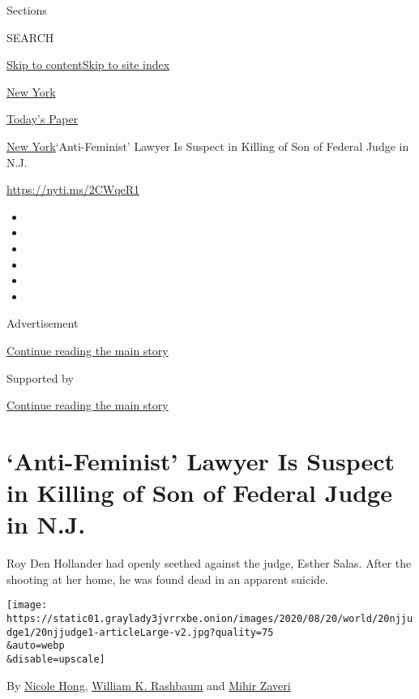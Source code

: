 Sections

SEARCH

\protect\hyperlink{site-content}{Skip to
content}\protect\hyperlink{site-index}{Skip to site index}

\href{https://www.nytimes3xbfgragh.onion/section/nyregion}{New York}

\href{https://myaccount.nytimes3xbfgragh.onion/auth/login?response_type=cookie\&client_id=vi}{}

\href{https://www.nytimes3xbfgragh.onion/section/todayspaper}{Today's
Paper}

\href{/section/nyregion}{New York}\textbar{}`Anti-Feminist' Lawyer Is
Suspect in Killing of Son of Federal Judge in N.J.

\url{https://nyti.ms/2CWqeR1}

\begin{itemize}
\item
\item
\item
\item
\item
\item
\end{itemize}

Advertisement

\protect\hyperlink{after-top}{Continue reading the main story}

Supported by

\protect\hyperlink{after-sponsor}{Continue reading the main story}

\hypertarget{anti-feminist-lawyer-is-suspect-in-killing-of-son-of-federal-judge-in-nj}{%
\section{`Anti-Feminist' Lawyer Is Suspect in Killing of Son of Federal
Judge in
N.J.}\label{anti-feminist-lawyer-is-suspect-in-killing-of-son-of-federal-judge-in-nj}}

Roy Den Hollander had openly seethed against the judge, Esther Salas.
After the shooting at her home, he was found dead in an apparent
suicide.

\texttt{[image: https://static01.graylady3jvrrxbe.onion/images/2020/08/20/world/20njjudge1/20njjudge1-articleLarge-v2.jpg?quality=75\\\&auto=webp\\\&disable=upscale]}

By \href{https://www.nytimes3xbfgragh.onion/by/nicole-hong}{Nicole
Hong},
\href{https://www.nytimes3xbfgragh.onion/by/william-k-rashbaum}{William
K. Rashbaum} and
\href{https://www.nytimes3xbfgragh.onion/by/mihir-zaveri}{Mihir Zaveri}


